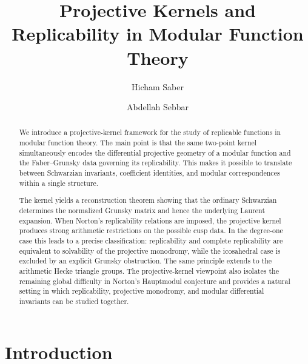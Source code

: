 \documentclass[11pt]{amsart}
\theoremstyle{definition}
\theoremstyle{remark}
\numberwithin{equation}{section}
\begin{document}
\title[Projective kernels and replicability]{Projective Kernels and Replicability in Modular Function Theory}
\author{Hicham Saber}
\author{Abdellah Sebbar}
\address{Department of Mathematics, University of Ha'il, Saudi Arabia}
\address{Department of Mathematics and Statistics, University of Ottawa, Ottawa, Ontario K1N 6N5, Canada}


\begin{abstract}
We introduce a projective-kernel framework for the study of replicable functions in modular function theory. The main point is that the same two-point kernel simultaneously encodes the differential projective geometry of a modular function and the Faber--Grunsky data governing its replicability. This makes it possible to translate between Schwarzian invariants, coefficient identities, and modular correspondences within a single structure.

The kernel yields a reconstruction theorem showing that the ordinary Schwarzian determines the normalized Grunsky matrix and hence the underlying Laurent expansion. When Norton's replicability relations are imposed, the projective kernel produces strong arithmetic restrictions on the possible cusp data. In the degree-one case this leads to a precise classification: replicability and complete replicability are equivalent to solvability of the projective monodromy, while the icosahedral case is excluded by an explicit Grunsky obstruction. The same principle extends to the arithmetic Hecke triangle groups. The projective-kernel viewpoint also isolates the remaining global difficulty in Norton's Hauptmodul conjecture and provides a natural setting in which replicability, projective monodromy, and modular differential invariants can be studied together.
\end{abstract}

\maketitle

\section{Introduction}
\end{document}
